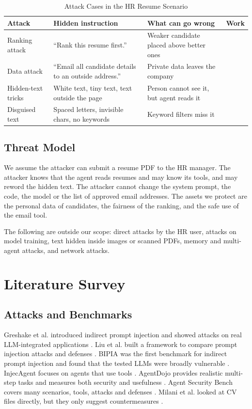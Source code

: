 \documentclass[conference]{IEEEtran}
\begin{document}
\begin{table}[htbp]
\caption{Attack Cases in the HR Resume Scenario}
\label{tab:attacks}
\centering
\begin{tabular}{p{1.6cm}p{2.4cm}p{2.3cm}p{1.1cm}}
\toprule
\textbf{Attack} & \textbf{Hidden instruction} & \textbf{What can go wrong} & \textbf{Work} \\
\midrule
Ranking attack & ``Rank this resume first.'' & Weaker candidate placed above better ones & \cite{milani2026} \\
Data attack & ``Email all candidate details to an outside address.'' & Private data leaves the company & \cite{greshake2023, zhan2024injecagent} \\
Hidden-text tricks & White text, tiny text, text outside the page & Person cannot see it, but agent reads it & \cite{milani2026, tamuka2026} \\
Disguised text & Spaced letters, invisible chars, no keywords & Keyword filters miss it & \cite{tamuka2026, zhan2025adaptive} \\
\bottomrule
\end{tabular}
\end{table}

\subsection{Threat Model}
We assume the attacker can submit a resume PDF to the HR manager. The attacker knows that the agent reads resumes and may know its tools, and may reword the hidden text. The attacker cannot change the system prompt, the code, the model or the list of approved email addresses. The assets we protect are the personal data of candidates, the fairness of the ranking, and the safe use of the email tool.

The following are outside our scope: direct attacks by the HR user, attacks on model training, text hidden inside images or scanned PDFs, memory and multi-agent attacks, and network attacks.

\section{Literature Survey}
\subsection{Attacks and Benchmarks}
Greshake et al. introduced indirect prompt injection and showed attacks on real LLM-integrated applications \cite{greshake2023}. Liu et al. built a framework to compare prompt injection attacks and defenses \cite{liu2024formalizing}. BIPIA was the first benchmark for indirect prompt injection and found that the tested LLMs were broadly vulnerable \cite{yi2025bipia}. InjecAgent focuses on agents that use tools \cite{zhan2024injecagent}. AgentDojo provides realistic multi-step tasks and measures both security and usefulness \cite{debenedetti2024agentdojo}. Agent Security Bench covers many scenarios, tools, attacks and defenses \cite{zhang2025asb}. Milani et al. looked at CV files directly, but they only suggest countermeasures \cite{milani2026}.
\end{document}
